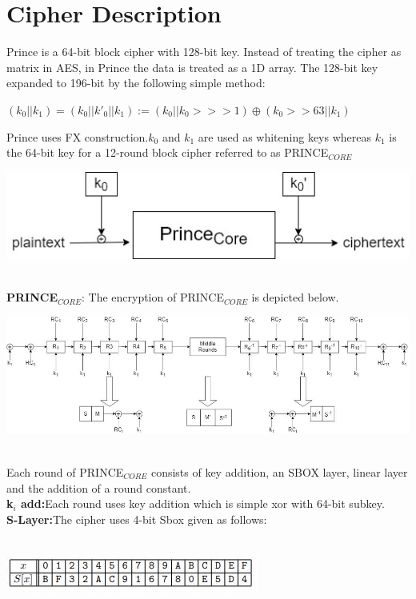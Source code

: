 \documentclass{transcrypto}
\begin{document}
\section{Cipher Description}
Prince is a 64-bit block cipher with 128-bit key. Instead of treating the cipher as matrix in AES, in Prince the data is treated as a 1D array. The 128-bit key expanded to 196-bit by the following simple method:\\
\begin{center}
    $(k_0||k_1) = (k_0||k'_0||k_1) := (k_0||k_0>>>1) \oplus (k_0>>63||k_1)$
\end{center}
Prince uses FX construction.$k_0$ and $k_1$ are used as whitening keys whereas $k_1$ is the 64-bit key for a 12-round block cipher referred to as PRINCE$_{CORE}$\\
\begin{center}
\includegraphics[scale=0.5]{Cipher.jpg} \\ \\
\end{center}
\textbf{PRINCE$_{CORE}$}: The encryption of PRINCE$_{CORE}$ is depicted below.\\
\begin{center}
    \includegraphics[scale=0.5]{Prince-12-Round.JPG}
\end{center}\\
Each round of PRINCE$_{CORE}$ consists of key addition, an SBOX layer, linear layer and the addition of a round constant.\\
\noindent
\textbf{k$_i$ add:}Each round uses key addition which is simple xor with 64-bit subkey.\\

\noindent
\textbf{S-Layer:}The cipher uses 4-bit Sbox given as follows:\\ \\
\begin{center}
    \includegraphics[]{S-box.JPG} \\ \\
\end{center}
\end{document}
